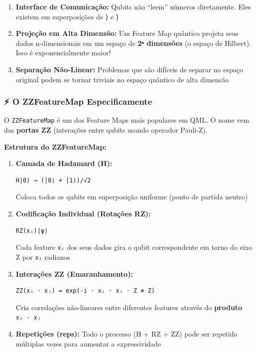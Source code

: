 \documentclass[
  brazilian,
]{report}
\providecommand{\tightlist}{%
  \setlength{\itemsep}{0pt}\setlength{\parskip}{0pt}}
\begin{document}
\begin{enumerate}
\def\labelenumi{\arabic{enumi}.}
\tightlist
\item
  \textbf{Interface de Comunicação:} Qubits não ``leem'' números
  diretamente. Eles existem em superposições de ⟩ e ⟩
\item
  \textbf{Projeção em Alta Dimensão:} Um Feature Map quântico projeta
  seus dados n-dimensionais em um espaço de \textbf{2ⁿ dimensões} (o
  espaço de Hilbert). Isso é exponencialmente maior!
\item
  \textbf{Separação Não-Linear:} Problemas que são difíceis de separar
  no espaço original podem se tornar triviais no espaço quântico de alta
  dimensão
\end{enumerate}

\subsubsection{⚡ O ZZFeatureMap
Especificamente}\label{o-zzfeaturemap-especificamente}

O \texttt{ZZFeatureMap} é um dos Feature Maps mais populares em QML. O
nome vem das \textbf{portas ZZ} (interações entre qubits usando operador
Pauli-Z).

\textbf{Estrutura do ZZFeatureMap:}

\begin{enumerate}
\def\labelenumi{\arabic{enumi}.}
\item
  \textbf{Camada de Hadamard (H):}

\begin{verbatim}
H|0⟩ → (|0⟩ + |1⟩)/√2
\end{verbatim}

  Coloca todos os qubits em superposição uniforme (ponto de partida
  neutro)
\item
  \textbf{Codificação Individual (Rotações RZ):}

\begin{verbatim}
RZ(xᵢ)|ψ⟩
\end{verbatim}

  Cada feature \texttt{xᵢ} dos seus dados gira o qubit correspondente em
  torno do eixo Z por \texttt{xᵢ} radianos
\item
  \textbf{Interações ZZ (Emaranhamento):}

\begin{verbatim}
ZZ(xᵢ · xⱼ) = exp(-i · xᵢ · xⱼ · Z ⊗ Z)
\end{verbatim}

  Cria correlações não-lineares entre diferentes features através do
  \textbf{produto} \texttt{xᵢ\ ·\ xⱼ}
\item
  \textbf{Repetições (reps):} Todo o processo (H + RZ + ZZ) pode ser
  repetido múltiplas vezes para aumentar a expressividade
\end{enumerate}
\end{document}
